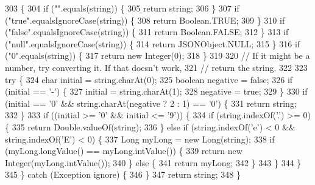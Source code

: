 \begin{DoxyCode}
303                                                       \{
304         \textcolor{keywordflow}{if} (\textcolor{stringliteral}{""}.equals(\textcolor{keywordtype}{string})) \{
305             \textcolor{keywordflow}{return} string;
306         \}
307         \textcolor{keywordflow}{if} (\textcolor{stringliteral}{"true"}.equalsIgnoreCase(\textcolor{keywordtype}{string})) \{
308             \textcolor{keywordflow}{return} Boolean.TRUE;
309         \}
310         \textcolor{keywordflow}{if} (\textcolor{stringliteral}{"false"}.equalsIgnoreCase(\textcolor{keywordtype}{string})) \{
311             \textcolor{keywordflow}{return} Boolean.FALSE;
312         \}
313         \textcolor{keywordflow}{if} (\textcolor{stringliteral}{"null"}.equalsIgnoreCase(\textcolor{keywordtype}{string})) \{
314             \textcolor{keywordflow}{return} JSONObject.NULL;
315         \}
316         \textcolor{keywordflow}{if} (\textcolor{stringliteral}{"0"}.equals(\textcolor{keywordtype}{string})) \{
317             \textcolor{keywordflow}{return} \textcolor{keyword}{new} Integer(0);
318         \}
319 
320 \textcolor{comment}{// If it might be a number, try converting it. If that doesn't work,}
321 \textcolor{comment}{// return the string.}
322 
323         \textcolor{keywordflow}{try} \{
324             \textcolor{keywordtype}{char} initial = \textcolor{keywordtype}{string}.charAt(0);
325             \textcolor{keywordtype}{boolean} negative = \textcolor{keyword}{false};
326             \textcolor{keywordflow}{if} (initial == \textcolor{charliteral}{'-'}) \{
327                 initial = \textcolor{keywordtype}{string}.charAt(1);
328                 negative = \textcolor{keyword}{true};
329             \}
330             \textcolor{keywordflow}{if} (initial == \textcolor{charliteral}{'0'} && \textcolor{keywordtype}{string}.charAt(negative ? 2 : 1) == \textcolor{charliteral}{'0'}) \{
331                 \textcolor{keywordflow}{return} string;
332             \}
333             \textcolor{keywordflow}{if} ((initial >= \textcolor{charliteral}{'0'} && initial <= \textcolor{charliteral}{'9'})) \{
334                 \textcolor{keywordflow}{if} (\textcolor{keywordtype}{string}.indexOf(\textcolor{charliteral}{'.'}) >= 0) \{
335                     \textcolor{keywordflow}{return} Double.valueOf(\textcolor{keywordtype}{string});
336                 \} \textcolor{keywordflow}{else} \textcolor{keywordflow}{if} (\textcolor{keywordtype}{string}.indexOf(\textcolor{charliteral}{'e'}) < 0 && \textcolor{keywordtype}{string}.indexOf(\textcolor{charliteral}{'E'}) < 0) \{
337                     Long myLong = \textcolor{keyword}{new} Long(\textcolor{keywordtype}{string});
338                     \textcolor{keywordflow}{if} (myLong.longValue() == myLong.intValue()) \{
339                         \textcolor{keywordflow}{return} \textcolor{keyword}{new} Integer(myLong.intValue());
340                     \} \textcolor{keywordflow}{else} \{
341                         \textcolor{keywordflow}{return} myLong;
342                     \}
343                 \}
344             \}
345         \}  \textcolor{keywordflow}{catch} (Exception ignore) \{
346         \}
347         \textcolor{keywordflow}{return} string;
348     \}
\end{DoxyCode}
